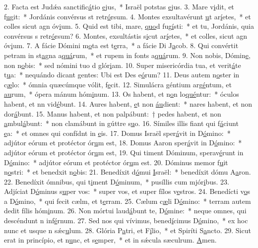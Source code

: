 2. Facta est Judǽa sanctific\uline{á}tio \uline{e}jus,~* Israël potstas \uline{e}jus.
3. Mare v\uline{i}dit, et f\uline{u}git:~* Jordánis convérsus st retr\uline{ó}rsum.
4. Montes exsultavérunt \uline{u}t ar\uline{í}etes,~* et colles sicut agn óv\uline{i}um.
5. Quid est tibi, mare, \uline{quo}d fug\uline{í}sti:~* et tu, Jordánis, quia convérsus s retr\uline{ó}rsum?
6. Montes, exsultástis s\uline{i}cut ar\uline{í}etes,~* et colles, sicut agn óv\uline{i}um.
7. A fácie Dómini m\uline{o}ta est t\uline{e}rra,~* a fácie Di J\uline{a}cob.
8. Qui convértit petram in st\uline{a}gna a\uline{quá}rum,~* et rupem in fonts a\uline{quá}rum.
9. Non nobis, Dómin\uline{e}, non n\uline{o}bis:~* sed nómini tuo d glór\uline{i}am.
10. Super misericórdia tua, et verit\uline{á}te t\uline{u}a:~* nequándo dicant gentes: Ubi est Des e\uline{ó}rum?
11. Deus autem n\uline{o}ster in c\uline{æ}lo:~* ómnia quæcúmque vólit, f\uline{e}cit.
12. Simulácra géntium arg\uline{é}ntum, et \uline{au}rum,~* ópera mánum hóm\uline{i}num.
13. Os habent, et n\uline{o}n lo\uline{qué}ntur:~* óculos habent, et nn vid\uline{é}bunt.
14. Aures habent, \uline{e}t non \uline{áu}dient:~* nares habent, et non dor\uline{á}bunt.
15. Manus habent, et non palpábunt:~† pedes habent, et non \uline{a}mbul\uline{á}bunt:~* non clamábunt in gúttre s\uline{u}o.
16. Símiles illis fiant qui f\uline{á}ciunt \uline{e}a:~* et omnes qui confídnt in \uline{e}is.
17. Domus Israël sper\uline{á}vit in D\uline{ó}mino:~* adjútor eórum et protéctor ór\uline{u}m est,
18. Domus Aaron sper\uline{á}vit in D\uline{ó}mino:~* adjútor eórum et protéctor ór\uline{u}m est,
19. Qui timent Dóminum, sperav\uline{é}runt in D\uline{ó}mino:~* adjútor eórum et protéctor ór\uline{u}m est.
20. Dóminus memor f\uline{u}it n\uline{o}stri:~* et benedxit n\uline{o}bis:
21. Benedíxit d\uline{ó}mui \uline{I}sraël:~* benedíxit dómu A\uline{a}ron.
22. Benedíxit ómnibus, qui t\uline{i}ment D\uline{ó}minum,~* pusíllis cum mjór\uline{i}bus.
23. Adjíciat D\uline{ó}minus s\uline{u}per vos:~* super vos, et super fílos v\uline{e}stros.
24. Benedícti v\uline{o}s a D\uline{ó}mino,~* qui fecit cælm, et t\uline{e}rram.
25. Cælum c\uline{æ}li D\uline{ó}mino:~* terram autem dedit fílis hóm\uline{i}num.
26. Non mórtui laud\uline{á}bunt te, D\uline{ó}mine:~* neque omnes, qui descéndunt n inf\uline{é}rnum.
27. Sed nos qui vívimus, bened\uline{í}cimus D\uline{ó}mino,~* ex hoc nunc et usque n sǽc\uline{u}lum.
28. Glória P\uline{a}tri, et F\uline{í}lio,~* et Spiríti S\uline{a}ncto.
29. Sicut erat in princípio, et n\uline{u}nc, et s\uline{e}mper,~* et in sǽcula sæculrum. \uline{A}men.
